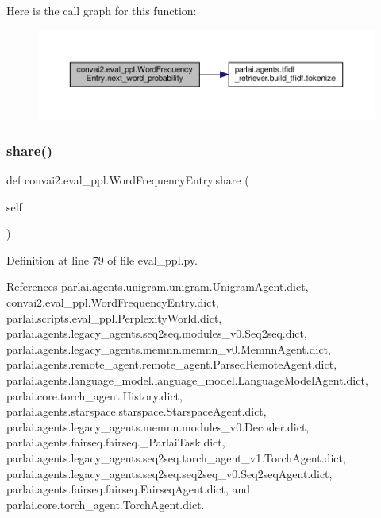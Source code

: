 Here is the call graph for this function\+:
\nopagebreak
\begin{figure}[H]
\begin{center}
\leavevmode
\includegraphics[width=350pt]{classconvai2_1_1eval__ppl_1_1WordFrequencyEntry_a8dace8d727764609e2cc305e79fab2a5_cgraph}
\end{center}
\end{figure}
\mbox{\label{classconvai2_1_1eval__ppl_1_1WordFrequencyEntry_a7c5da99b28c3c7e03eaac7079d7d608c}} 
\subsubsection{\texorpdfstring{share()}{share()}}
{\footnotesize\ttfamily def convai2.\+eval\+\_\+ppl.\+Word\+Frequency\+Entry.\+share (\begin{DoxyParamCaption}\item[{}]{self }\end{DoxyParamCaption})}



Definition at line 79 of file eval\+\_\+ppl.\+py.



References parlai.\+agents.\+unigram.\+unigram.\+Unigram\+Agent.\+dict, convai2.\+eval\+\_\+ppl.\+Word\+Frequency\+Entry.\+dict, parlai.\+scripts.\+eval\+\_\+ppl.\+Perplexity\+World.\+dict, parlai.\+agents.\+legacy\+\_\+agents.\+seq2seq.\+modules\+\_\+v0.\+Seq2seq.\+dict, parlai.\+agents.\+legacy\+\_\+agents.\+memnn.\+memnn\+\_\+v0.\+Memnn\+Agent.\+dict, parlai.\+agents.\+remote\+\_\+agent.\+remote\+\_\+agent.\+Parsed\+Remote\+Agent.\+dict, parlai.\+agents.\+language\+\_\+model.\+language\+\_\+model.\+Language\+Model\+Agent.\+dict, parlai.\+core.\+torch\+\_\+agent.\+History.\+dict, parlai.\+agents.\+starspace.\+starspace.\+Starspace\+Agent.\+dict, parlai.\+agents.\+legacy\+\_\+agents.\+memnn.\+modules\+\_\+v0.\+Decoder.\+dict, parlai.\+agents.\+fairseq.\+fairseq.\+\_\+\+Parlai\+Task.\+dict, parlai.\+agents.\+legacy\+\_\+agents.\+seq2seq.\+torch\+\_\+agent\+\_\+v1.\+Torch\+Agent.\+dict, parlai.\+agents.\+legacy\+\_\+agents.\+seq2seq.\+seq2seq\+\_\+v0.\+Seq2seq\+Agent.\+dict, parlai.\+agents.\+fairseq.\+fairseq.\+Fairseq\+Agent.\+dict, and parlai.\+core.\+torch\+\_\+agent.\+Torch\+Agent.\+dict.



